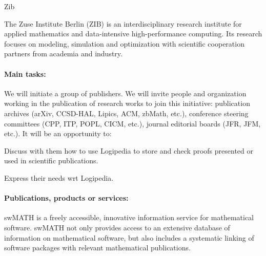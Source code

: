 \begin{sitedescription}{Zib}



The Zuse Institute Berlin (ZIB) is an interdisciplinary research institute for 
applied mathematics and data-intensive high-performance computing. 
Its research focuses on modeling, simulation and optimization with scientific 
cooperation partners from academia and industry.

\paragraph*{Main tasks:}


	We will initiate a group of publishers. We will invite
	people and organization working in the publication of research
	works to join this initiative: publication archives (arXiv, CCSD-HAL,
	Lipics, ACM, zbMath, etc.), conference steering committees (CPP,
	ITP, POPL, CICM, etc.), journal editorial boards (JFR, JFM,
	etc.). It will be an opportunity to:
	
	\begin{compactitem}
		\item Discuss with them how to use Logipedia to store and check proofs presented or used in scientific publications.
		\item Express their needs wrt Logipedia.
	\end{compactitem}

 


\paragraph*{Publications, products or services:}


\begin{compactitem}
\item swMATH is a freely accessible, innovative information service for mathematical software. 
                           swMATH not only provides access to an extensive database of information on mathematical software, 
                           but also includes a systematic linking of software packages with relevant mathematical publications.
\end{compactitem}


\end{sitedescription}
